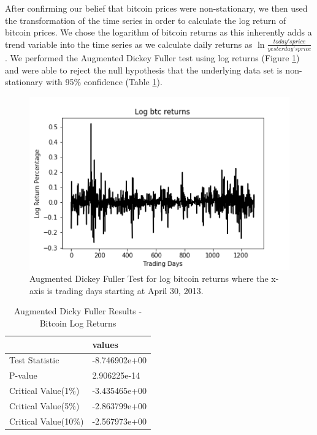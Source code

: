 \documentclass[9pt,twocolumn,twoside]{ilcss}
\begin{document}
After confirming our belief that bitcoin prices were non-stationary, we then used the transformation of the time series in order to calculate the log return of bitcoin prices. We chose the logarithm of bitcoin returns as this inherently adds a trend variable into the time series as we calculate daily returns as $\ln{\frac{today's price}{yesterday's price}}$. We performed the Augmented Dickey Fuller test using log returns (Figure \ref{fig_ADF_results_BTC_log_return}) and were able to reject the null hypothesis that the underlying data set is non-stationary with 95\% confidence (Table \ref{table_ADF_results_BTC_log_return}). 

\begin{figure}[h]
\centering
\includegraphics[width=0.85\linewidth]{btc_ret_1.png}
\caption{Augmented Dickey Fuller Test for log bitcoin returns where the x-axis is trading days starting at April 30, 2013.}
\label{fig_ADF_results_BTC_log_return}
\end{figure}

\begin{table}[h]
\centering
\caption{Augmented Dicky Fuller Results - Bitcoin Log Returns}
\label{table_ADF_results_BTC_log_return}
\begin{tabular}{ll} 
\hline
\hline
                     & values         \\ 
\hline
Test Statistic       & -8.746902e+00  \\
P-value              & 2.906225e-14   \\
Critical Value(1\%)  & -3.435465e+00  \\
Critical Value(5\%)  & -2.863799e+00  \\
Critical Value(10\%) & -2.567973e+00  \\
\hline
\end{tabular}
\end{table}
\end{document}
